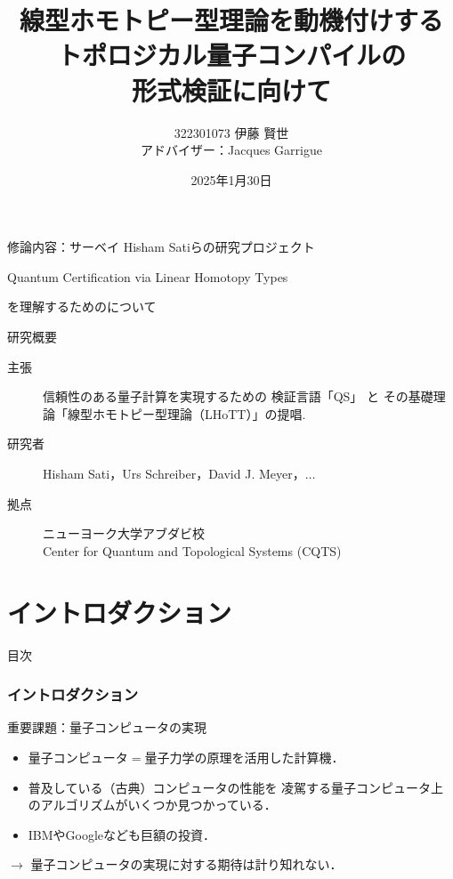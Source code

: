 \documentclass{beamer} %
\title[トポロジカル量子コンパイル]{線型ホモトピー型理論を動機付けする\\
トポロジカル量子コンパイルの\\
形式検証に向けて}
\author[322301073 伊藤 賢世]{322301073 伊藤 賢世\\
アドバイザー：Jacques Garrigue}
\date{2025年1月30日}
\newcommand{\0}{\mathbf{0}}
\newcommand{\1}{\mathbf{1}}
\newcommand{\2}{\mathbf{2}}
\begin{document}
\begin{frame}
  \maketitle
\end{frame}

\begin{frame}
  \begin{block}{修論内容：サーベイ}
    Hisham Satiらの研究プロジェクト
    \begin{center}
      Quantum Certification
      via Linear Homotopy Types
    \end{center}
    を理解するためのについて
  \end{block}
  \begin{block}{研究概要}
    \begin{description}
      \item[主張] 信頼性のある量子計算を実現するための
        検証言語「QS」 と
        その基礎理論「線型ホモトピー型理論（LHoTT）」の提唱.
      \item[研究者] Hisham Sati，Urs Schreiber，David J. Meyer，\(\ldots\)
      \item[拠点] ニューヨーク大学アブダビ校\\
        Center for Quantum and
        Topological Systems (CQTS)
    \end{description}
  \end{block}
\end{frame}


\section{イントロダクション}
\begin{frame}[noframenumbering]{目次}
  \tableofcontents[currentsection]
\end{frame}

\begin{frame}
  \frametitle{イントロダクション}
  \begin{block}{重要課題：量子コンピュータの実現}
    \begin{itemize}
      \item 量子コンピュータ\(=\)量子力学の原理を活用した計算機．
      \item 普及している（古典）コンピュータの性能を
            凌駕する量子コンピュータ上のアルゴリズムがいくつか見つかっている．
      \item IBMやGoogleなども巨額の投資．
    \end{itemize}
    \begin{center}
      \(\longrightarrow\)
      量子コンピュータの実現に対する期待は計り知れない．
    \end{center}
  \end{block}
\end{frame}
\end{document}
